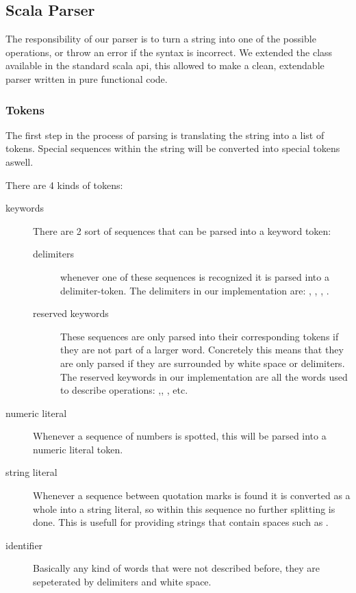 \subsection{Scala Parser}

The responsibility of our parser is to turn a string into one of the possible
operations, or throw an error if the syntax is incorrect. We extended the
 class available in the standard scala api, this
allowed to make a clean, extendable parser written in pure functional code.

\subsubsection{Tokens} 

The first step in the process of parsing is translating the string into a list
of tokens. Special sequences within the string will be converted into special
tokens aswell.

\par
There are 4 kinds of tokens:
\begin{description} 
\item[keywords] There are 2 sort of sequences that can be parsed into a keyword
token:
	\begin{description}
	\item[delimiters] whenever one of these sequences is recognized it is parsed
	into a delimiter-token. The delimiters in our implementation are: \sn{\{},
	\sn{\}}, \sn{,}, \sn{:}.
	\item[reserved keywords] These sequences are only parsed into their
	corresponding tokens if they are not part of a larger word. Concretely this
	means that they are only parsed if they are surrounded by white space or
	delimiters. The reserved keywords in our implementation are all the words used
	to describe operations: ,, , etc.
	\end{description}
\item[numeric literal] Whenever a sequence of numbers is spotted, this will be
parsed into a numeric literal token.
\item[string literal] Whenever a sequence between quotation marks is found it is
converted as a whole into a string literal, so within this sequence no further
splitting is done. This is usefull for providing strings that contain spaces
such as .
\item[identifier] Basically any kind of words that were not described before,
they are sepeterated by delimiters and white space.
\end{description}
	
